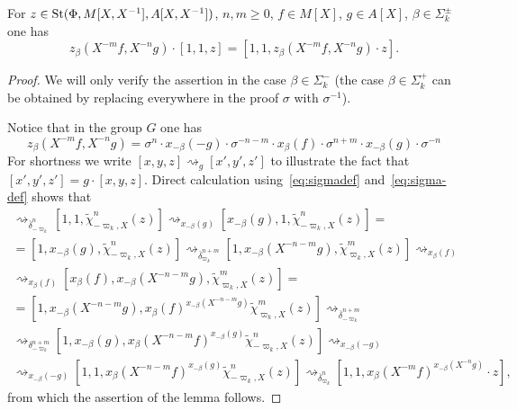 \begin{cor}
\begin{lemma} \label{lem:family1}
    For $z \in \operatorname{St}(\Phi, M[X, X^{-1}], A[X, X^{-1}])$, $n, m \geq 0$, $f \in M[X]$, $g \in A[X]$, $\beta \in \Sigma_k^\pm$ one has
    \[ z_\beta(X^{-m}f, X^{-n}g) \cdot [1, 1, z] =  [1, 1, z_\beta(X^{-m}f, X^{-n}g) \cdot z].\]
\end{lemma}
\begin{proof}
    We will only verify the assertion in the case $\beta \in \Sigma_k^-$
     (the case $\beta \in \Sigma_k^+$ can be obtained by replacing everywhere in the proof $\sigma$ with $\sigma^{-1}$).

    Notice that in the group $G$ one has
    \begin{equation} z_\beta(X^{-m}f, X^{-n}g) =
     \sigma^n \cdot x_{-\beta}(-g) \cdot \sigma^{-n-m} \cdot x_{\beta}(f) \cdot \sigma^{n + m} \cdot x_{-\beta}(g) \cdot \sigma^{-n} \end{equation}
    For shortness we write $[x, y, z] \rightsquigarrow_{g} [x', y', z']$ to illustrate the fact that
     $[x', y', z'] = g \cdot [x, y, z]$.
    Direct calculation using~\eqref{eq:sigmadef} and~\eqref{eq:sigma-def} shows that
    \begin{multline*}
    [1, 1, z] \rightsquigarrow_{\overline{\delta}_{-\varpi_k}^n}
    [1, 1, \widetilde{\chi}^n_{-\varpi_k, X}(z)] \rightsquigarrow_{x_{-\beta}(g)}
    [x_{-\beta}(g), 1, \widetilde{\chi}_{-\varpi_k, X}^n(z)] = \\
    = [1, x_{-\beta}(g), \widetilde{\chi}^n_{-\varpi_k, X}(z)] \rightsquigarrow_{\overline{\delta}_{\varpi_k}^{n + m}}
    [1, x_{-\beta}(X^{-n-m}g), \widetilde{\chi}^m_{\varpi_k, X}(z)] \rightsquigarrow_{ x_{\beta}(f) } \\
    \rightsquigarrow_{ x_{\beta}(f) } [x_{\beta}(f), x_{-\beta}(X^{-n-m}g), \widetilde{\chi}^m_{\varpi_k, X}(z)] = \\
    = [1, x_{-\beta}(X^{-n-m}g), x_{\beta}(f)^{x_{-\beta}(X^{-n-m}g)} \widetilde{\chi}^m_{\varpi_k, X}(z)] \rightsquigarrow_{\overline{\delta}^{n + m}_{-\varpi_k}} \\
    \rightsquigarrow_{\delta_{-\varpi_k}^{n + m}} [1, x_{-\beta}(g), x_{\beta}(X^{-n-m}f)^{x_{-\beta}(g)} \widetilde{\chi}^n_{-\varpi_k, X}(z)] \rightsquigarrow_{ x_{-\beta}(-g) } \\
    \rightsquigarrow_{ x_{-\beta}(-g) } [1, 1, x_{\beta}(X^{-n-m}f)^{x_{-\beta}(g)} \widetilde{\chi}^n_{-\varpi_k, X}(z)] \rightsquigarrow_{ \overline{\delta}_{\varpi_k}^n }
    [1, 1, x_{\beta}(X^{-m}f)^{x_{-\beta}(X^{-n}g)} \cdot z],
    \end{multline*}
    from which the assertion of the lemma follows.
\end{proof}


\end{cor}
